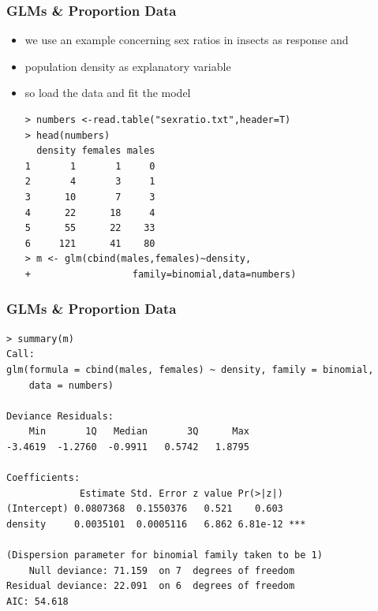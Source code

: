 \begin{frame}[fragile]\frametitle{GLMs \& Proportion Data}
  \begin{itemize}
  \item we use an example concerning sex ratios in insects as response and
  \item population density as explanatory variable
  \item so load the data and fit the model
\begin{verbatim}
> numbers <-read.table("sexratio.txt",header=T)
> head(numbers)
  density females males
1       1       1     0
2       4       3     1
3      10       7     3
4      22      18     4
5      55      22    33
6     121      41    80
> m <- glm(cbind(males,females)~density,
+                  family=binomial,data=numbers)
\end{verbatim}
  \end{itemize}
\end{frame}

\begin{frame}[fragile]\frametitle{GLMs \& Proportion Data}\footnotesize
\begin{verbatim}
> summary(m)
Call:
glm(formula = cbind(males, females) ~ density, family = binomial, 
    data = numbers)

Deviance Residuals: 
    Min       1Q   Median       3Q      Max  
-3.4619  -1.2760  -0.9911   0.5742   1.8795  

Coefficients:
             Estimate Std. Error z value Pr(>|z|)    
(Intercept) 0.0807368  0.1550376   0.521    0.603    
density     0.0035101  0.0005116   6.862 6.81e-12 ***

(Dispersion parameter for binomial family taken to be 1)
    Null deviance: 71.159  on 7  degrees of freedom
Residual deviance: 22.091  on 6  degrees of freedom
AIC: 54.618
\end{verbatim}
\end{frame}

